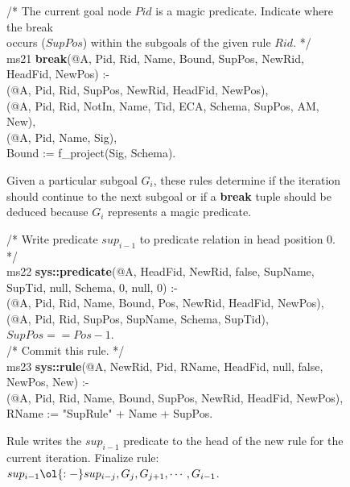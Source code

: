 \begin{appendix}
\begin{figure}[!t]
\begin{boxedminipage}{\linewidth}
/* The current goal node $Pid$ is a magic predicate. Indicate where the break \\
occurs ($SupPos$) within the subgoals of the given rule $Rid$. */ \\
ms21 {\bf break}(@A, Pid, Rid, Name, Bound, SupPos, NewRid, HeadFid, NewPos) :- \\
(@A, Pid, Rid, SupPos, NewRid, HeadFid, NewPos), \\
(@A, Pid, Rid, NotIn, Name, Tid, ECA, Schema, SupPos, AM, New), \\
(@A, Pid, Name, Sig), \\
\datalogspace Bound := f\_project(Sig, Schema). \\

\end{boxedminipage}
\caption{\label{ch:evita:fig:mpgoal} Given a particular subgoal $G_i$, these rules determine
if the iteration should continue to the next subgoal or if a {\bf break} tuple should be
deduced because $G_i$ represents a magic predicate. }
\end{figure}

\begin{figure}[!t]
\ssp
\centering
\begin{boxedminipage}{\linewidth}
/* Write predicate $sup_{i-1}$ to predicate relation in head position $0$. */ \\
ms22 {\bf sys::predicate}(@A, HeadFid, NewRid, false, SupName, SupTid, null, Schema, 0, null, 0) :- \\
(@A, Pid, Rid, Name, Bound, Pos, NewRid, HeadFid, NewPos), \\
(@A, Pid, Rid, SupPos, SupName, Schema, SupTid), \\
\datalogspace $SupPos == Pos - 1$. \\
  
/* Commit this rule. */ \\
ms23 {\bf sys::rule}(@A, NewRid, Pid, RName, HeadFid, null, false, NewPos, New) :- \\
(@A, Pid, Rid, Name, Bound, SupPos, NewRid, HeadFid, NewPos), \\
\datalogspace RName := "SupRule" + Name + SupPos. \\

\end{boxedminipage}
\caption{\label{ch:evita:fig:supiter} Rule writes the $sup_{i-1}$ predicate to the head 
of the new rule for the current iteration.
Finalize rule: $sup_{i-1} \ol{:-} sup_{i-j}, G_j, G_{j+1}, \cdots, G_{i-1}$.}
\end{figure}


\end{appendix}
